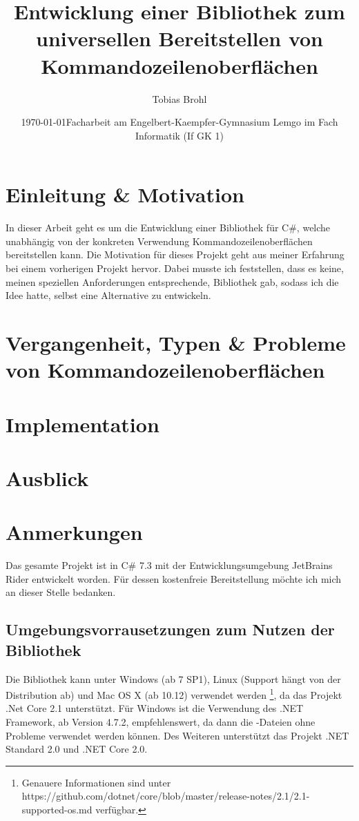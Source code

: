 \documentclass[a4paper,11pt,titlepage,ngerman]{article}
\title{Entwicklung einer Bibliothek zum universellen Bereitstellen von Kommandozeilenoberflächen}
\author{Tobias Brohl}
\date{\today \linebreak \linebreak Facharbeit am Engelbert-Kaempfer-Gymnasium Lemgo im Fach Informatik (If GK 1)}
\newcommand{\inlinecode}[1]{{\color{green}{\lstinline[language=]$#1$}}}
\begin{document}
 \begin{sloppypar}
  \maketitle
  \setcounter{tocdepth}{5}
  \setcounter{page}{0}
  \thispagestyle{empty}
  \tableofcontents
  \pagebreak
  \section{Einleitung \& Motivation}\label{sec:Intro}
  In dieser Arbeit geht es um die Entwicklung einer Bibliothek für C\#, welche unabhängig von der konkreten Verwendung Kommandozeilenoberflächen bereitstellen kann.
  Die Motivation für dieses Projekt geht aus meiner Erfahrung bei einem vorherigen Projekt hervor.
  Dabei musste ich feststellen, dass es keine, meinen speziellen Anforderungen entsprechende, Bibliothek gab, 
  sodass ich die Idee hatte, selbst eine Alternative zu entwickeln.
  \section{Vergangenheit, Typen \& Probleme von Kommandozeilenoberflächen}
  

  \section{Implementation}\label{sec:Content}
  

  \section{Ausblick}\label{sec:Future}
  

  \section{Anmerkungen}\label{sec:AdditionalNotes}
  Das gesamte Projekt ist in C\# 7.3 mit der Entwicklungsumgebung JetBrains Rider entwickelt worden.
  Für dessen kostenfreie Bereitstellung möchte ich mich an dieser Stelle bedanken.
  \subsection{Umgebungsvorrausetzungen zum Nutzen der Bibliothek}\label{subsec:SystemRequirements}
   Die Bibliothek kann unter Windows (ab 7 SP1), Linux (Support hängt von der Distribution ab) und Mac OS X (ab 10.12) verwendet werden
  \footnote{Genauere Informationen sind unter https://github.com/dotnet/core/blob/master/release-notes/2.1/2.1-supported-os.md verfügbar.}, 
  da das Projekt .Net Core 2.1 unterstützt.
  Für Windows ist die Verwendung des .NET Framework, ab Version 4.7.2, empfehlenswert, da dann die \inlinecode{.exe}-Dateien ohne Probleme verwendet werden können.
  Des Weiteren unterstützt das Projekt .NET Standard 
2.0 und .NET Core 2.0.

\end{sloppypar}
\end{document}
